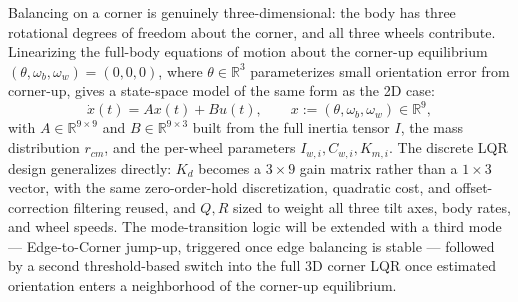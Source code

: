 Balancing on a corner is genuinely three-dimensional: the body has three rotational degrees of freedom about the corner, and all three wheels contribute. Linearizing the full-body equations of motion about the corner-up equilibrium $(\theta,\omega_b,\omega_w)=(0,0,0)$, where $\theta\in\mathbb{R}^3$ parameterizes small orientation error from corner-up, gives a state-space model of the same form as the 2D case:
\begin{equation}
\dot x(t) = Ax(t) + Bu(t), \qquad x := (\theta,\omega_b,\omega_w) \in \mathbb{R}^9,
\end{equation}
with $A\in\mathbb{R}^{9\times9}$ and $B\in\mathbb{R}^{9\times3}$ built from the full inertia tensor $I$, the mass distribution $r_{cm}$, and the per-wheel parameters $I_{w,i}, C_{w,i}, K_{m,i}$. The discrete LQR design generalizes directly: $K_d$ becomes a $3\times9$ gain matrix rather than a $1\times3$ vector, with the same zero-order-hold discretization, quadratic cost, and offset-correction filtering reused, and $Q,R$ sized to weight all three tilt axes, body rates, and wheel speeds. The mode-transition logic will be extended with a third mode — Edge-to-Corner jump-up, triggered once edge balancing is stable — followed by a second threshold-based switch into the full 3D corner LQR once estimated orientation enters a neighborhood of the corner-up equilibrium.
